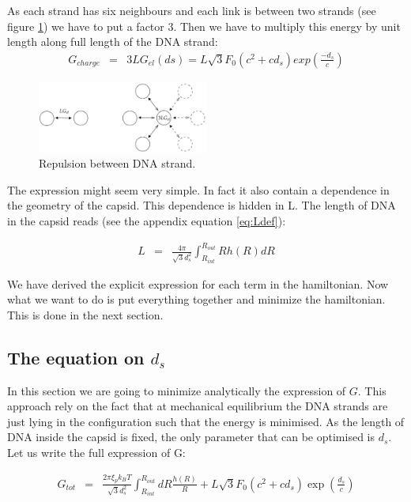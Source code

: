 \documentclass{article}
\begin{document}
As each strand has six neighbours and each link is between two strands (see figure \ref{fig:lattice}) we have to put a factor 3. Then we have to multiply this energy by unit length along full length of the DNA strand:
\begin{eqnarray}
    G_{charge} &=& 3 L G_{el}\left(ds\right) = L\sqrt{3} F_0 \left( c^2 + cd_s \right) exp \left( \frac{- d_s}{c} \right) \label{eq:gcharge}
\end{eqnarray}

\begin{figure}[H]
    \centering
    \includegraphics[width=0.5\textwidth]{diagram_Gcharge.png}
    \caption{Repulsion between DNA strand.}
    \label{fig:lattice}
\end{figure}

The expression might seem very simple. In fact it also contain a dependence in the geometry of the capsid. This dependence is hidden in L. The length of DNA in the capsid reads (see the appendix equation \ref{eq:Ldef}):

\begin{eqnarray*}
    L & = & \frac{4 \pi}{\sqrt{3} d_s^2} \int_{R_{int}}^{R_{out}} R h(R) dR
\end{eqnarray*}

We have derived the explicit expression for each term in the hamiltonian. Now what we want to do is put everything together and minimize the hamiltonian. This is done in the next section.

\subsection{The equation on $d_s$}

In this section we are going to minimize analytically the expression of $G$. This approach rely on the fact that at mechanical equilibrium the DNA strands are just lying in the configuration such that the energy is minimised. As the length of DNA inside the capsid is fixed, the only parameter that can be optimised is $d_s$. Let us write the full expression of G:

\begin{eqnarray}
    G_{tot} &=& \frac{2 \pi \xi_p k_B T}{\sqrt{3} d_s^2} \int_{R_{int}}^{R_{out}} dR \frac{h(R)}{R} + L \sqrt{3} F_0 \left( c^2 +cd_s \right) \exp{ \left( \frac{d_s}{c} \right) }
    \label{eq:Gtot}
\end{eqnarray}
\end{document}
